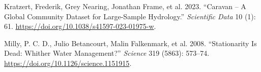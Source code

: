 \documentclass[
  letterpaper,
  DIV=11,
  numbers=noendperiod]{scrartcl}
\newlength{\cslhangindent}
\newenvironment{CSLReferences}[2] %
 {\begin{list}{}{%
  \setlength{\itemindent}{0pt}
  \setlength{\leftmargin}{0pt}
  \setlength{\parsep}{0pt}
  \ifodd #1
   \setlength{\leftmargin}{\cslhangindent}
   \setlength{\itemindent}{-1\cslhangindent}
  \fi
  \setlength{\itemsep}{#2\baselineskip}}}
 {\end{list}}
\begin{document}
\begin{CSLReferences}{1}{1}
Kratzert, Frederik, Grey Nearing, Jonathan Frame, et al. 2023.
{``Caravan -- {A} Global Community Dataset for Large-Sample
Hydrology.''} \emph{Scientific Data} 10 (1): 61.
\url{https://doi.org/10.1038/s41597-023-01975-w}.

Milly, P. C. D., Julio Betancourt, Malin Falkenmark, et al. 2008.
{``Stationarity Is Dead: Whither Water Management?''} \emph{Science} 319
(5863): 573--74. \url{https://doi.org/10.1126/science.1151915}.

\end{CSLReferences}
\end{document}

